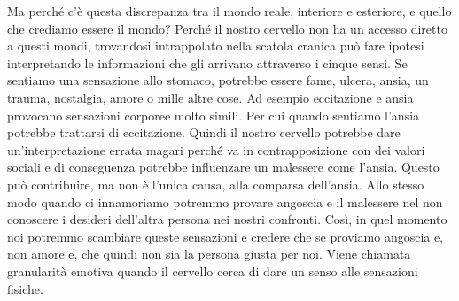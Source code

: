 \documentclass[12pt]{book} %
\begin{document}
Ma perché c'è questa discrepanza tra il mondo reale, interiore e esteriore, e quello che crediamo
essere il mondo? Perché il nostro cervello non ha un accesso diretto a questi mondi, trovandosi intrappolato nella
scatola cranica può fare ipotesi interpretando le informazioni che gli arrivano attraverso i cinque sensi. 
Se sentiamo una sensazione allo stomaco,
potrebbe essere fame, ulcera, ansia, un trauma, nostalgia, amore o mille altre cose. Ad esempio eccitazione e ansia
provocano sensazioni corporee molto simili. Per cui quando sentiamo l'ansia potrebbe trattarsi di eccitazione. Quindi il nostro cervello potrebbe dare un'interpretazione errata magari perché va in contrapposizione con
dei valori sociali e di conseguenza potrebbe influenzare un malessere come l'ansia. Questo può contribuire, ma non è l’unica causa, alla comparsa dell’ansia. Allo stesso modo quando ci innamoriamo
potremmo provare angoscia e il malessere nel non conoscere i desideri dell'altra persona nei nostri confronti. 
Così, in quel momento noi potremmo scambiare queste sensazioni e credere che se proviamo angoscia e, non amore e, che quindi non sia la persona giusta per noi. Viene chiamata granularità emotiva quando il cervello cerca di dare un senso alle sensazioni 
fisiche. 
\end{document}
